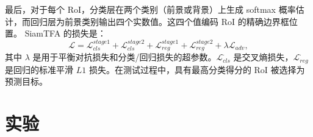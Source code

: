 最后，对于每个 RoI，分类层在两个类别（前景或背景）上生成 softmax 概率估计，而回归层为前景类别输出四个实数值。这四个值编码 RoI 的精确边界框位置。
SiamTFA 的损失是：
\begin{equation}
\mathcal{L} = \mathcal{L}_{cls}^{stage1} + \mathcal{L}_{cls}^{stage2} + \mathcal{L}_{reg}^{stage1}+\mathcal{L}_{reg}^{stage2} +  \lambda \mathcal{L}_{adv},
\end{equation}
其中 $\lambda$ 是用于平衡对抗损失和分类/回归损失的超参数。$\mathcal{L}_{cls}^{\cdot}$ 是交叉熵损失，$\mathcal{L}_{reg}^{\cdot}$ 是回归的标准平滑 $L1$ 损失。在测试过程中，具有最高分类得分的 RoI 被选择为预测目标。

\section{实验}

